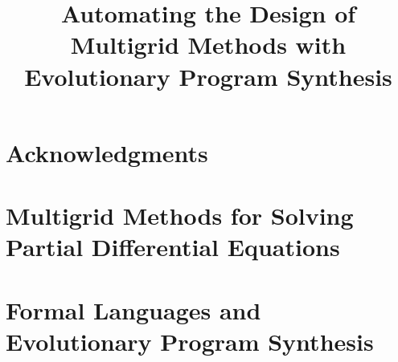 \documentclass[
  paper = a5paper,
  language = english,
  acronym = nosymbol,
  acronymline = novertical,
  bibliography = combined,
  bibliographypart = all,
  titlesize = Huge,
  par = halfskip,
]{faupress}
\title{Automating the Design of Multigrid Methods with Evolutionary Program Synthesis}
\institute{\phantom{}}
\theoremstyle{definition}
\numberwithin{equation}{chapter}
\begin{document}
\maketitle

\frontmatter
  
  \makefacultytitle
  \begin{abstract}
    
  \end{abstract}
  \begin{zusammenfassung}
    
  \end{zusammenfassung}
\chapter*{Acknowledgments}




\tableofcontents

\faupressprintacronyms
\begingroup
\listofalgorithms
\let\clearpage\relax
\listoflistings
\endgroup


\mainmatter
\begin{introduction}

\end{introduction}
\chapter{Multigrid Methods for Solving Partial Differential Equations}
  
  
  
\chapter{Formal Languages and Evolutionary Program Synthesis}
\label{chapter:formal-languages-and-gp}
  
  
\end{document}

